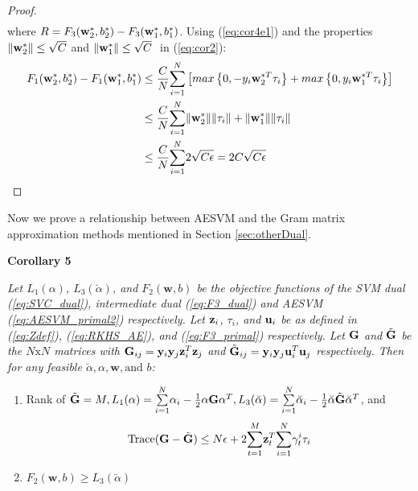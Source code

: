 \documentclass[twoside]{article}
\begin{document}
\begin{proof}
\begin{align}
\end{align}
where $R = F_3 ({\bf w}_2 ^*, b _2 ^*) - F_3 ({\bf w}_1 ^*, b _1 ^*)$. Using (\ref{eq:cor4e1}) and the properties
 $\|{\bf w}_2 ^*\| \le \sqrt{C}$ and $\|{\bf w}_1 ^*\| \le \sqrt{C}\;$ in (\ref{eq:cor2}):
\begin{align*}
F_1 ({\bf w}_2 ^*, b _2 ^*) - F_1 ({\bf w}_1 ^*, b _1 ^*) &\le \frac{C}{N}\overset{N}{\underset{i = 1}{\sum}} \left[ max\left\{0, -y_{i}{\bf w}_2 ^{*T} \tau_i\right\} + max\left\{0, y_{i}{\bf w}_1 ^{*T} \tau_i\right\}\right]\\
&\le \frac{C}{N}\overset{N}{\underset{i = 1}{\sum}} \|{\bf w}_2^*\| \|\tau_i\| + \|{\bf w}_1^*\| \|\tau_i\|\\
&\le \frac{C}{N}\overset{N}{\underset{i = 1}{\sum}} 2\sqrt{C\epsilon} = 2C\sqrt{C\epsilon}
\end{align*}
\end{proof}

Now we prove a relationship between AESVM and the Gram matrix approximation methods mentioned in Section \ref{sec:otherDual}.

\noindent
{\bf Corollary 5} {\it Let $L_1(\alpha)$, $L_3(\breve{\alpha})$, and ${F}_2(\mathbf{w} ,b)$ be the objective functions of the SVM dual (\ref{eq:SVC_dual}), intermediate dual (\ref{eq:F3_dual}) and AESVM (\ref{eq:AESVM_primal2}) respectively. Let ${\bf z}_i$, $\tau_i$, and ${\bf u}_i$ be as defined in (\ref{eq:Zdef}), (\ref{eq:RKHS_AE}), and (\ref{eq:F3_primal}) respectively. Let $\bf G$ and $\tilde{\bf G}$ be the $N\mathrm{x}N$ matrices with ${\bf G}_{ij} = {\bf y}_i {\bf y}_j {\bf z}_i ^T {\bf z}_j$ and $\tilde{\bf G}_{ij} = {\bf y}_i {\bf y}_j {\bf u}_i ^T {\bf u}_j$ respectively. Then for any feasible $\breve{\alpha},\alpha, \mathbf{w}, \text{and } b$:
\begin{enumerate}
\item Rank of $\tilde{\bf G} = M, L_1(\alpha) = \overset{N}{\underset{i = 1}{\sum}}\alpha_{i} - \frac{1}{2}\alpha {\bf G} \alpha ^T, L_3(\breve{\alpha}) = \overset{N}{\underset{i = 1}{\sum}}\breve{\alpha}_{i} - \frac{1}{2}\breve{\alpha} \tilde{\bf G} \breve{\alpha}^T$, and
\begin{equation*}
\mathrm{Trace}({\bf G} - \tilde{\bf G}) \le N\epsilon + 2 \overset{M}{\underset{t = 1}\sum} {\bf z}_t ^T \overset{N}{\underset{i = 1}{\sum}} \gamma^i _t \tau_i
\end{equation*}
\item ${F}_2(\mathbf{w} ,b) \ge L_3(\breve{\alpha})$
\end{enumerate}
}
\end{document}
